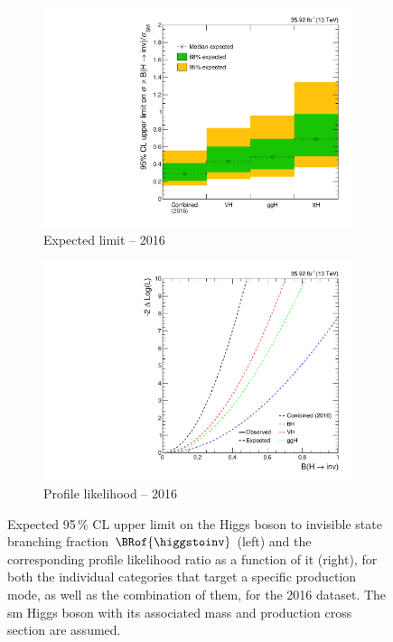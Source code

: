 \begin{figure}[htbp]
    \centering
    \begin{subfigure}[t]{0.45\textwidth}  %
        \includegraphics[width=\textwidth]{figures/limits/per_year/limit_2016_comb_Scenario5.pdf}
        \caption{Expected limit -- 2016}
    \end{subfigure}
    \hspace{0.05\textwidth}
    \begin{subfigure}[t]{0.45\textwidth}
        \includegraphics[width=\textwidth]{figures/likelihood_scan/profile_likelihood_scan_2016_Scenario5.pdf}
        \caption{Profile likelihood -- 2016}
    \end{subfigure}
    \caption[Expected 95\,\% CL upper limit on the Higgs boson to invisible state branching fraction $\BRof{\higgstoinv}$ and the corresponding profile likelihood ratio as a function of it, for both the individual categories that target a specific production mode, as well as the combination of them, for the 2016 dataset]{Expected 95\,\% CL upper limit on the Higgs boson to invisible state branching fraction $\BRof{\higgstoinv}$ (left) and the corresponding profile likelihood ratio as a function of it (right), for both the individual categories that target a specific production mode, as well as the combination of them, for the 2016 dataset. The \acrlong{sm} Higgs boson with its associated mass and production cross section are assumed.}

\end{figure}
